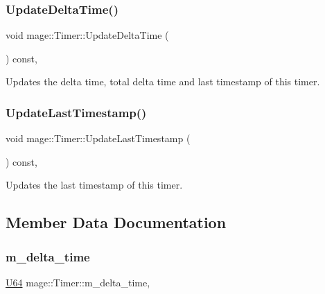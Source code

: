 \subsubsection{\texorpdfstring{Update\+Delta\+Time()}{UpdateDeltaTime()}}
{\footnotesize\ttfamily void mage\+::\+Timer\+::\+Update\+Delta\+Time (\begin{DoxyParamCaption}{ }\end{DoxyParamCaption}) const\hspace{0.3cm}{\ttfamily [private]}, {\ttfamily [noexcept]}}

Updates the delta time, total delta time and last timestamp of this timer. \hypertarget{classmage_1_1_timer_ad0ff38a28efd65e7c147c8c399245d06}{}\label{classmage_1_1_timer_ad0ff38a28efd65e7c147c8c399245d06} 
\subsubsection{\texorpdfstring{Update\+Last\+Timestamp()}{UpdateLastTimestamp()}}
{\footnotesize\ttfamily void mage\+::\+Timer\+::\+Update\+Last\+Timestamp (\begin{DoxyParamCaption}{ }\end{DoxyParamCaption}) const\hspace{0.3cm}{\ttfamily [private]}, {\ttfamily [noexcept]}}

Updates the last timestamp of this timer. 

\subsection{Member Data Documentation}
\hypertarget{classmage_1_1_timer_a2a6fcda6238524401de58b4462121286}{}\label{classmage_1_1_timer_a2a6fcda6238524401de58b4462121286} 
\subsubsection{\texorpdfstring{m\+\_\+delta\+\_\+time}{m\_delta\_time}}
{\footnotesize\ttfamily \hyperlink{namespacemage_a6672cf3c861707ce4a3235a3eb43941d}{U64} mage\+::\+Timer\+::m\+\_\+delta\+\_\+time\hspace{0.3cm}{\ttfamily [mutable]}, {\ttfamily [private]}}


